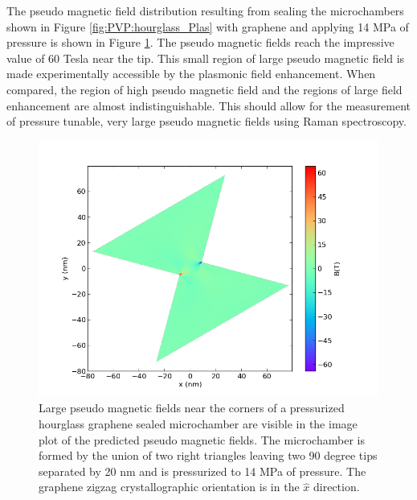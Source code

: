 The pseudo magnetic field distribution resulting from sealing the microchambers shown in Figure \ref{fig:PVP:hourglass_Plas} with graphene and applying 14 MPa of pressure is shown in Figure \ref{fig:PVP:hourglass_PMF}.
The pseudo magnetic fields reach the impressive value of 60 Tesla near the tip.
This small region of large pseudo magnetic field is made experimentally accessible by the plasmonic field enhancement.
When compared, the region of high pseudo magnetic field and the regions of large field enhancement are almost indistinguishable.
This should allow for the measurement of pressure tunable, very large pseudo magnetic fields using Raman spectroscopy.

\begin{figure} 
  \begin{center}
  \includegraphics[scale=.75]{Figs_PVP/HourGlass_PMF.png}
  \end{center}
  \caption[Large pseudo magnetic fields near the corners of a pressurized hourglass graphene sealed microchamber]{\label{fig:PVP:hourglass_PMF} Large pseudo magnetic fields near the corners of a pressurized hourglass graphene sealed microchamber are visible in the image plot of the predicted pseudo magnetic fields. The microchamber is formed by the union of two right triangles leaving two 90 degree tips separated by 20 nm and is pressurized to 14 MPa of pressure. The graphene zigzag crystallographic orientation is in the $\hat{x}$ direction.}
\end{figure}

